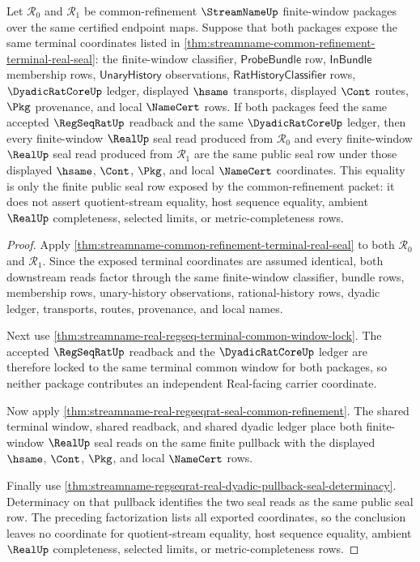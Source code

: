 \begin{theorem}
\label{thm:streamname-common-refinement-real-seal-uniqueness}
Let $\mathcal R_0$ and $\mathcal R_1$ be common-refinement $\StreamNameUp$ finite-window packages over the same certified endpoint maps. Suppose that both packages expose the same terminal coordinates listed in \autoref{thm:streamname-common-refinement-terminal-real-seal}: the finite-window classifier, $\mathsf{ProbeBundle}$ row, $\mathsf{InBundle}$ membership rows, $\mathsf{UnaryHistory}$ observations, $\mathsf{RatHistoryClassifier}$ rows, $\DyadicRatCoreUp$ ledger, displayed $\hsame$ transports, displayed $\Cont$ routes, $\Pkg$ provenance, and local $\NameCert$ rows. If both packages feed the same accepted $\RegSeqRatUp$ readback and the same $\DyadicRatCoreUp$ ledger, then every finite-window $\RealUp$ seal read produced from $\mathcal R_0$ and every finite-window $\RealUp$ seal read produced from $\mathcal R_1$ are the same public seal row under those displayed $\hsame$, $\Cont$, $\Pkg$, and local $\NameCert$ coordinates. This equality is only the finite public seal row exposed by the common-refinement packet: it does not assert quotient-stream equality, host sequence equality, ambient $\RealUp$ completeness, selected limits, or metric-completeness rows.
\end{theorem}
\begin{proof}
Apply \autoref{thm:streamname-common-refinement-terminal-real-seal} to both $\mathcal R_0$ and $\mathcal R_1$. Since the exposed terminal coordinates are assumed identical, both downstream reads factor through the same finite-window classifier, bundle rows, membership rows, unary-history observations, rational-history rows, dyadic ledger, transports, routes, provenance, and local names.

Next use \autoref{thm:streamname-real-regseq-terminal-common-window-lock}. The accepted $\RegSeqRatUp$ readback and the $\DyadicRatCoreUp$ ledger are therefore locked to the same terminal common window for both packages, so neither package contributes an independent Real-facing carrier coordinate.

Now apply \autoref{thm:streamname-real-regseqrat-seal-common-refinement}. The shared terminal window, shared readback, and shared dyadic ledger place both finite-window $\RealUp$ seal reads on the same finite pullback with the displayed $\hsame$, $\Cont$, $\Pkg$, and local $\NameCert$ rows.

Finally use \autoref{thm:streamname-regseqrat-real-dyadic-pullback-seal-determinacy}. Determinacy on that pullback identifies the two seal reads as the same public seal row. The preceding factorization lists all exported coordinates, so the conclusion leaves no coordinate for quotient-stream equality, host sequence equality, ambient $\RealUp$ completeness, selected limits, or metric-completeness rows.
\end{proof}

